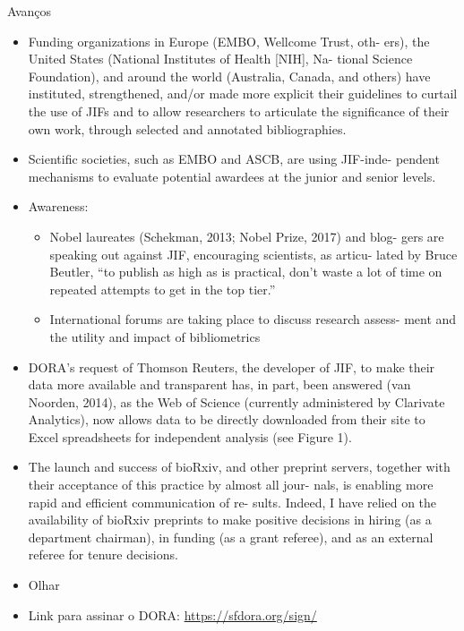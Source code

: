 \documentclass[bigger]{beamer}
\begin{document}
\begin{frame}[label={sec:org3004f58}]{Avanços \parencite{schmid2017}}
\begin{itemize}
\item Funding organizations in Europe (EMBO, Wellcome Trust, oth- ers), the United States (National Institutes of Health [NIH], Na- tional Science Foundation), and around the world (Australia, Canada, and others) have instituted, strengthened, and/or made more explicit their guidelines to curtail the use of JIFs and to allow researchers to articulate the significance of their own work, through selected and annotated bibliographies.
\item Scientific societies, such as EMBO and ASCB, are using JIF-inde- pendent mechanisms to evaluate potential awardees at the junior and senior levels.
\item Awareness:
\begin{itemize}
\item Nobel laureates (Schekman, 2013; Nobel Prize, 2017) and blog- gers are speaking out against JIF, encouraging scientists, as articu- lated by Bruce Beutler, “to publish as high as is practical, don’t waste a lot of time on repeated attempts to get in the top tier.”
\item International forums are taking place to discuss research assess- ment and the utility and impact of bibliometrics
\end{itemize}
\item DORA’s request of Thomson Reuters, the developer of JIF, to make their data more available and transparent has, in part, been answered (van Noorden, 2014), as the Web of Science (currently administered by Clarivate Analytics), now allows data to be directly downloaded from their site to Excel spreadsheets for independent analysis (see Figure 1).
\item The launch and success of bioRxiv, and other preprint servers, together with their acceptance of this practice by almost all jour- nals, is enabling more rapid and efficient communication of re- sults. Indeed, I have relied on the availability of bioRxiv preprints to make positive decisions in hiring (as a department chairman), in funding (as a grant referee), and as an external referee for tenure decisions.

\item Olhar \parencite{hatch2020}
\end{itemize}



\begin{itemize}
\item Link para assinar o DORA: \url{https://sfdora.org/sign/}
\end{itemize}
\end{frame}
\end{document}
